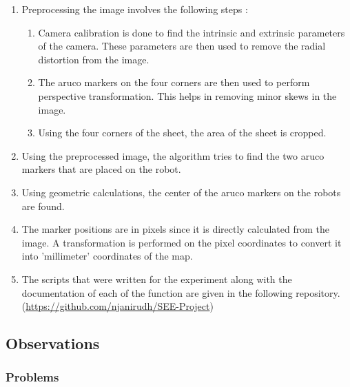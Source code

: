\documentclass[10pt,a4paper]{article}
\begin{document}
\begin{enumerate}
		\item
		Preprocessing the image involves the following steps :
		\vspace{0.2cm}
		\begin{enumerate}
			\item
			Camera calibration is done to find the intrinsic and extrinsic parameters of the camera.	These parameters are then used to remove the radial distortion from the image.
			\item
			The aruco markers on the four corners are then used to perform perspective transformation. This helps in removing minor skews in the image.
			\item
			Using the four corners of the sheet, the area of the sheet is cropped.			
		\end{enumerate}
		\vspace{0.3cm}
		\item
		Using the preprocessed image, the algorithm tries to find the two aruco markers that are placed on the robot.
		\item
		Using geometric calculations, the center of the aruco markers on the robots are found. 
		\item
		The marker positions are in pixels since it is directly calculated from the image. A transformation is performed on the pixel coordinates to convert it into 'millimeter' coordinates of the map.
		\item
		The scripts that were written for the experiment along with the documentation of each of the function are given in the following repository. (\href{https://github.com/njanirudh/SEE-Project}{https://github.com/njanirudh/SEE-Project})
\end{enumerate}

\subsection{Observations}

\subsubsection{Problems}
\end{document}
